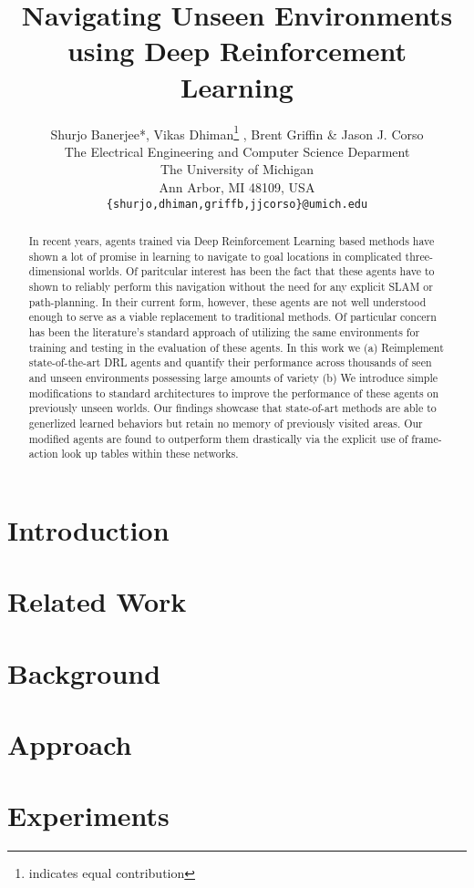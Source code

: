\documentclass[]{article} %
\title{Navigating Unseen Environments using Deep Reinforcement Learning}
\author{Shurjo Banerjee*, Vikas Dhiman\thanks{indicates equal contribution} , Brent Griffin \& Jason J. Corso  \\
The Electrical Engineering and Computer Science Deparment\\
The University of Michigan\\
Ann Arbor, MI 48109, USA \\
\texttt{\{shurjo,dhiman,griffb,jjcorso\}@umich.edu} \\
}
\begin{document}
\maketitle

\begin{abstract}
In recent years, agents trained via Deep Reinforcement Learning based methods have shown a lot of promise in learning to navigate to goal locations in complicated three-dimensional worlds. Of paritcular interest has been the fact that these agents have to shown to reliably perform this navigation  without the need for any explicit SLAM or path-planning. In their current form, however, these agents are not well understood enough to serve as a viable replacement to traditional methods. Of particular concern has been the literature's standard approach of utilizing the same environments for training and testing in the evaluation of these agents. In this work we (a) Reimplement state-of-the-art DRL agents and quantify their performance across thousands of seen and unseen environments possessing large amounts of variety (b) We introduce simple modifications to standard architectures to improve the performance of these agents on previously unseen worlds. Our findings showcase that state-of-art methods are able to generlized learned behaviors but retain no memory of previously visited areas. Our modified agents are found to outperform them drastically via the explicit use of frame-action look up tables within these networks. 
\end{abstract}

\section{Introduction}


\section{Related Work}


\section{Background}


\section{Approach}


\section{Experiments}

\end{document}
